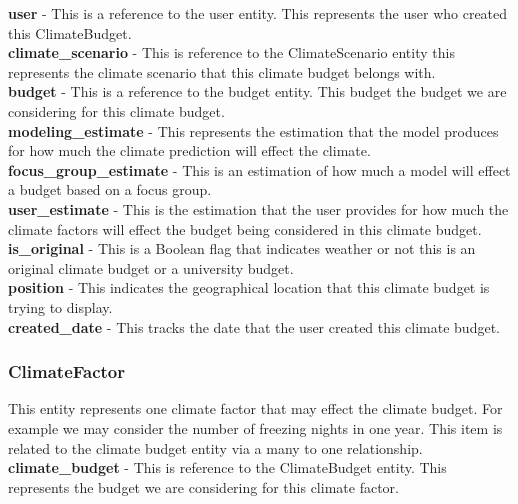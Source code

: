\documentclass[onecolumn, draftclsnofoot,10pt, compsoc]{article}
\begin{document}
					\textbf{user} - This is a reference to the user entity. This represents the user who created this ClimateBudget.\\
					
					\textbf{climate\_scenario} - This is reference to the ClimateScenario entity this represents the climate scenario that this climate budget belongs with.\\
					
					\textbf{budget} - This is a reference to the budget entity. This budget the budget we are considering for this climate budget.\\
					
					\textbf{modeling\_estimate} - This represents the estimation that the model produces for how much the climate prediction will effect the climate.\\
					
					\textbf{focus\_group\_estimate} - This is an estimation of how much a model will effect a budget based on a focus group.\\
					
					\textbf{user\_estimate} - This is the estimation that the user provides for how much the climate factors will effect the budget being considered in this climate budget.\\
					
					\textbf{is\_original} - This is a Boolean flag that indicates weather or not this is an original climate budget or a university budget.\\
					
					\textbf{position} - This indicates the geographical location that this climate budget is trying to display.\\
					
					\textbf{created\_date} - This tracks the date that the user created this climate budget.\\
				
				\subsubsection{ClimateFactor}
					This entity represents one climate factor that may effect the climate budget. For example we may consider the number of freezing nights in one year. This item is related to the climate budget entity via a many to one relationship.\\
				
					\textbf{climate\_budget} - This is reference to the ClimateBudget entity. This represents the budget we are considering for this climate factor.\\
					
\end{document}
